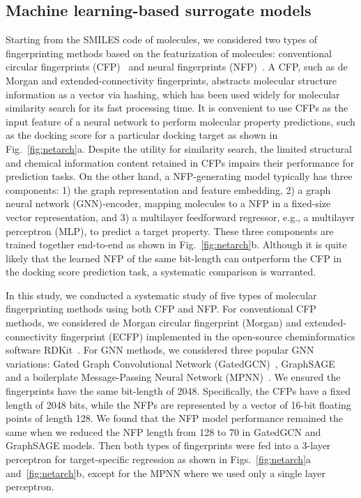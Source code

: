 \documentclass[conference]{IEEEtran}
\begin{document}
\subsection{Machine learning-based surrogate models}
Starting from the SMILES code of molecules, we considered two types of fingerprinting methods based on the featurization of molecules: conventional circular fingerprints (CFP)~\cite{morgan1965generation, rogers2010extended} and neural fingerprints (NFP)~\cite{duvenaud_convolutional_2015-1}. A CFP, such as de Morgan and extended-connectivity fingerprints, abstracts molecular structure information as a vector via hashing, which has been used widely for molecular similarity search for its fast processing time. It is convenient to use CFPs as the input feature of a neural network to perform molecular property predictions, such as the docking score for a particular docking target as shown in Fig.~\ref{fig:netarch}a. Despite the utility for similarity search, the limited structural and chemical information content retained in CFPs impairs their performance for prediction tasks. On the other hand, a NFP-generating model typically has three components: 1) the graph representation and feature embedding, 2) a graph neural network (GNN)-encoder, mapping molecules to a NFP in a fixed-size vector representation, and 3) a multilayer feedforward regressor, e.g., a multilayer perceptron (MLP), to predict a target property. 
These three components are trained together end-to-end as shown in Fig.~\ref{fig:netarch}b. Although it is quite likely that the learned NFP of the same bit-length can outperform the CFP in the docking score prediction task, a systematic comparison is warranted.

In this study, we conducted a systematic study of five types of molecular fingerprinting methods using both CFP and NFP. For conventional CFP methods, we considered de Morgan circular fingerprint (Morgan) and extended-connectivity fingerprint (ECFP) implemented in the open-source cheminformatics software RDKit~\cite{rdkit}. For GNN methods, we considered three popular GNN variations: Gated Graph Convolutional Network (GatedGCN)~\cite{yujia2016gated,bresson_residual_2018}, GraphSAGE~\cite{ying_hierarchical_2018,hamilton_inductive_2017} and a boilerplate Message-Passing Neural Network (MPNN)~\cite{gilmer_neural_2017}. We ensured the fingerprints have the same bit-length of 2048. Specifically, the CFPs have a fixed length of 2048 bits, while the NFPs are represented by a vector of 16-bit floating points of length 128. We found that the NFP model performance remained the same when we reduced the NFP length from 128 to 70 in GatedGCN and GraphSAGE models. Then both types of fingerprints were fed into a 3-layer perceptron for target-specific regression as shown in Figs.~\ref{fig:netarch}a and~\ref{fig:netarch}b, except for the MPNN where we used only a single layer perceptron.
\end{document}
